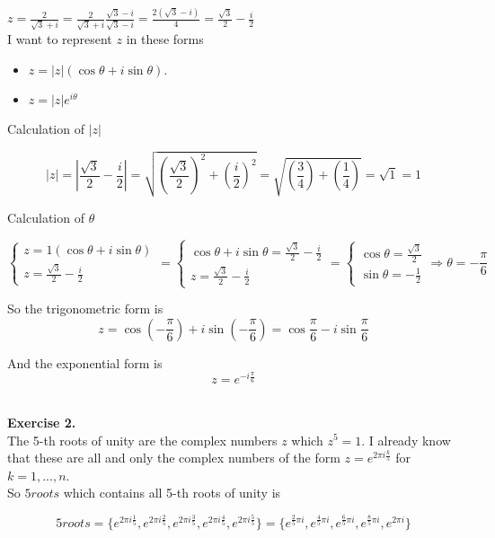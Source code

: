 \documentclass{article}
\begin{document}
\(z = \frac{2}{\sqrt{3} + i} = \frac{2}{\sqrt{3} + i} \frac{\sqrt{3} - i}{\sqrt{3} - i} = \frac{2(\sqrt{3} - i)}{4} = \frac{\sqrt{3}}{2} - \frac{i}{2}\) \\

I want to represent \(z\) in these forms
\begin{itemize}
    \item \(z = |z|(\cos \theta + i \sin \theta)\).
    \item \(z = |z|e^{i\theta}\)
\end{itemize} 

Calculation of \(|z|\)

\[|z| = |\frac{\sqrt{3}}{2} - \frac{i}{2}| = \sqrt{\left(\frac{\sqrt{3}}{2}\right)^2 + \left(\frac{i}{2}\right)^2} = \sqrt{\left(\frac{3}{4}\right) + \left(\frac{1}{4}\right)} = \sqrt{1} = 1 \]

Calculation of \(\theta\)

\[ 
\begin{cases} z=1(\cos \theta + i \sin \theta) \\ z = \frac{\sqrt{3}}{2} - \frac{i}{2} \end{cases} = 
\begin{cases} \cos \theta + i \sin \theta = \frac{\sqrt{3}}{2} - \frac{i}{2} \\ z = \frac{\sqrt{3}}{2} - \frac{i}{2} \end{cases} = 
\begin{cases} \cos \theta = \frac{\sqrt{3}}{2} \\ \sin \theta = - \frac{1}{2} \end{cases} \Rightarrow
\theta = - \frac{\pi}{6}
\]

So the trigonometric form is
\[z = \cos \left(- \frac{\pi}{6}\right) + i \sin \left(- \frac{\pi}{6}\right) = \cos  \frac{\pi}{6} - i \sin \frac{\pi}{6} \]

And the exponential form is
\[z = e^{-i \frac{\pi}{6}}\] \\
\pagebreak

\textbf{Exercise 2.}\\

The 5-th roots of unity are the complex numbers \(z\) which \(z^5 = 1\). I already know that these are all and only the complex numbers of the form
\(z = e^{2 \pi i \frac{k}{5}}\) for \(k = 1,...,n\). \\

So \(5roots\) which contains all 5-th roots of unity is

\[5roots = 
\{ e^{2 \pi i \frac{1}{5}}, e^{2 \pi i \frac{2}{5}}, e^{2 \pi i \frac{3}{5}}, e^{2 \pi i \frac{4}{5}}, e^{2 \pi i \frac{5}{5}}\} =
\{e^{\frac{2}{5} \pi i }, e^{ \frac{4}{5} \pi i}, e^{ \frac{6}{5} \pi i}, e^{ \frac{8}{5} \pi i}, e^{2 \pi i }\} \]
\end{document}
